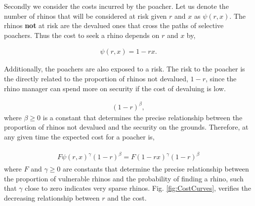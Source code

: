 \documentclass[10pt]{article}
\begin{document}
Secondly we consider the costs incurred by the poacher. Let us denote the number
of rhinos that will be considered at risk given \(r\) and \(x\) as \(\psi(r, x)\).
The rhinos \textbf{not} at risk are the devalued ones 
that cross the paths of selective poachers. Thus the cost to seek a rhino depends 
on \(r\) and \(x\) by,

\begin{eqnarray}
    \label{eqn:psi}
    \psi(r, x) = 1 - rx.
\end{eqnarray}

Additionally, the poachers are also exposed to a risk. The risk to the poacher is
the directly related to the proportion of rhinos not devalued, \(1 - r\), since 
the rhino manager can spend more on security if the cost of devaluing is low.

\begin{eqnarray}
    \label{eqn:risk}
    (1 - r)^{\beta},
\end{eqnarray}
where \(\beta \geq 0\) is a constant that determines the precise relationship between
the proportion of rhinos not devalued and the security on the grounds. Therefore,
at any given time the expected cost for a poacher is, 

\begin{eqnarray}
    \label{eqn:individual_cost}
    \begin{array}{l}
    F \psi(r, x)^{\gamma} (1 - r)^{\beta} = F (1 - rx) ^{\gamma} (1 - r) ^{\beta}
    \end{array}
\end{eqnarray}
where \(F\) and \(\gamma \geq 0\) are constants that determine the precise relationship
between the proportion of vulnerable rhinos and the probability of finding a rhino,
such that \(\gamma\) close to zero indicates very sparse rhinos. Fig.
\ref{fig:CostCurves},  verifies the decreasing relationship between \(r\) and the
cost.
\end{document}
